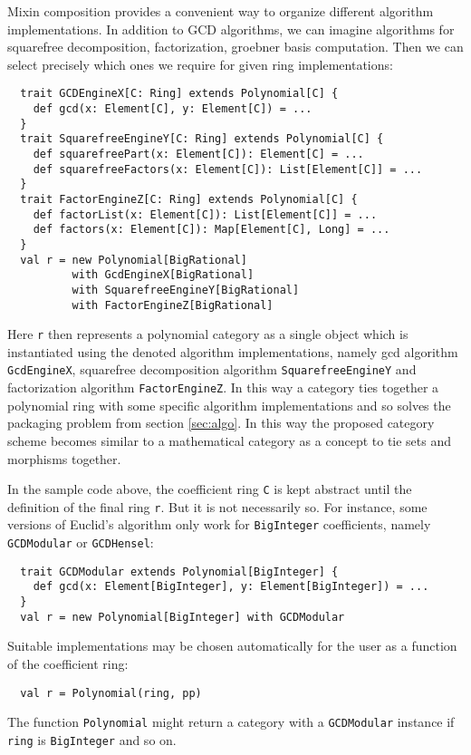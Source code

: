 \documentclass{llncs}
\newcommand{\code}[1]{\texttt{#1}}
\begin{document}
Mixin composition provides a convenient way to organize different
algorithm implementations. In addition to GCD algorithms, we can
imagine algorithms for squarefree decomposition, factorization,
groebner basis computation. Then we can select precisely which ones we
require for given ring implementations:
%
\begin{verbatim}
  trait GCDEngineX[C: Ring] extends Polynomial[C] {
    def gcd(x: Element[C], y: Element[C]) = ...
  }
  trait SquarefreeEngineY[C: Ring] extends Polynomial[C] {
    def squarefreePart(x: Element[C]): Element[C] = ...
    def squarefreeFactors(x: Element[C]): List[Element[C]] = ...
  }
  trait FactorEngineZ[C: Ring] extends Polynomial[C] {
    def factorList(x: Element[C]): List[Element[C]] = ...
    def factors(x: Element[C]): Map[Element[C], Long] = ...
  }
  val r = new Polynomial[BigRational]
          with GcdEngineX[BigRational] 
          with SquarefreeEngineY[BigRational]
          with FactorEngineZ[BigRational]
\end{verbatim}
%
Here \code{r} then represents a polynomial category as a single object
which is instantiated using the denoted algorithm implementations,
namely gcd algorithm \code{Gcd\-Engine\-X}, squarefree decomposition
algorithm \code{Square\-free\-Engine\-Y} and factorization algorithm
\code{Factor\-Engine\-Z}. In this way a category ties together a
polynomial ring with some specific algorithm implementations and so
solves the packaging problem from section \ref{sec:algo}. In this way
the proposed category scheme becomes similar to a mathematical
category as a concept to tie sets and morphisms together.

In the sample code above, the coefficient ring \code{C} is kept abstract until
the definition of the final ring \code{r}. But it is not necessarily so. For
instance, some versions of Euclid's algorithm only work for \code{BigInteger}
coefficients, namely \code{GCDModular} or \code{GCDHensel}:
%
\begin{verbatim}
  trait GCDModular extends Polynomial[BigInteger] {
    def gcd(x: Element[BigInteger], y: Element[BigInteger]) = ...
  }
  val r = new Polynomial[BigInteger] with GCDModular
\end{verbatim}

Suitable implementations may be chosen automatically for the user as a function
of the coefficient ring:
%
\begin{verbatim}
  val r = Polynomial(ring, pp)
\end{verbatim}
%
The function \code{Poly\-nomial} might return a category with a
\code{GCD\-Modular} instance if \code{ring} is \code{Big\-Integer} and
so on.
\end{document}
